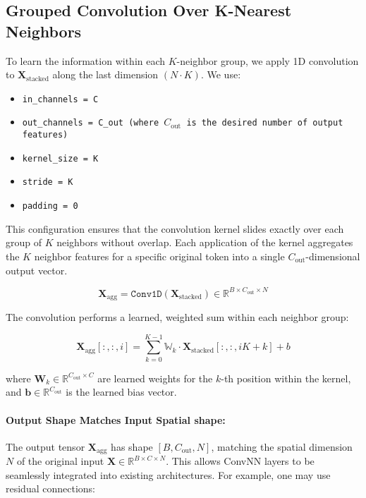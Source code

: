 \documentclass{article}
\begin{document}
\subsection{Grouped Convolution Over K-Nearest Neighbors}
To learn the information within each \(K\)-neighbor group, we apply 1D convolution to \(\mathbf{X}_{\text{stacked}}\) along the last dimension \((N \cdot K)\). We use: 

\begin{itemize}
    \item \texttt{in\_channels = C}
    \item \texttt{out\_channels = C\_out (where \(C_{\text{out}}\) is the desired number of output features)}
    \item \texttt{kernel\_size = K}
    \item \texttt{stride = K}
    \item \texttt{padding = 0}
\end{itemize}

This configuration ensures that the convolution kernel slides exactly over each group of \(K\) neighbors without overlap. Each application of the kernel aggregates the \(K\) neighbor features for a specific original token into a single \(C_{\text{out}}\)-dimensional output vector. 

\[
    \mathbf{X}_{\text{agg}} = \texttt{Conv1D}(\mathbf{X}_{\text{stacked}}) \in \mathbb{R}^{B \times C_{\text{out}} \times N}
\]

The convolution performs a learned, weighted sum within each neighbor group: 

\[
    \mathbf{X}_{\text{agg}}[:, :, i] = \sum_{k=0}^{K-1} \mathbb{W}_k \cdot \mathbf{X}_{\text{stacked}}[:, :, iK + k] + b
\]

where \(\mathbf{W}_k \in \mathbb{R}^{C_{\text{out}} \times C}\) are learned weights for the \(k\)-th position within the kernel, and \(\mathbf{b} \in \mathbb{R}^{C_{\text{out}}}\) is the learned bias vector.

\paragraph{Output Shape Matches Input Spatial shape: }
The output tensor \(\mathbf{X}_{\text{agg}}\) has shape \([B, C_{\text{out}}, N]\), matching the spatial dimension \(N\) of the original input \(\mathbf{X} \in \mathbb{R}^{B \times C \times N}\). This allows ConvNN layers to be seamlessly integrated into existing architectures. For example, one may use residual connections: 
\end{document}
